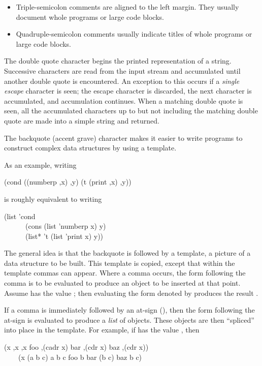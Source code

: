 \begin{flushdesc}
\begin{itemize}
\item
{}
Triple-semicolon comments are aligned to the left margin.
They usually document whole programs or large code blocks.

\item
{}
Quadruple-semicolon comments usually indicate titles of whole programs or large code blocks.
\end{itemize}

\item[\cd{"}]
The double quote character begins the printed representation
of a string.
Successive characters are read from the input stream and accumulated until
another double quote is encountered.
An exception to this occurs if a \emph{single escape} character
is seen; the escape character is discarded,
the next character is accumulated, and accumulation
continues.  When a matching double quote is seen, all the accumulated
characters up to but not including the matching double quote are
made into a simple string and returned.

\item[\cd{{\Xbq}}]
The backquote (accent grave) character
makes it easier to write programs to construct complex data structures by
using a template.
\label{BACKQUOTE}

As an example, writing
\begin{lisp}
{\Xbq}(cond ((numberp ,x) ,{\Xatsign}y) (t (print ,x) ,{\Xatsign}y))
\end{lisp}
is roughly equivalent to writing
\begin{lisp}
(list 'cond  \\
~~~~~~(cons (list 'numberp x) y)  \\
~~~~~~(list* 't (list 'print x) y))
\end{lisp}
The general idea is that the backquote is followed by a template,
a picture of a data structure to be built.  This template is copied,
except that within the template commas can appear.  Where a comma
occurs, the form following the comma is to be evaluated to produce an object to
be inserted at that point.  Assume  has the value ; then
evaluating the form denoted by  produces
the result .

If a comma is immediately followed by an at-sign (\cd{{\Xatsign}}), then the
form following the at-sign is evaluated to produce a \emph{list} of objects.
These objects are then ``spliced'' into place in the template.  For
example, if  has the value , then
\begin{lisp}
{\Xbq}(x ,x ,{\Xatsign}x foo ,(cadr x) bar ,(cdr x) baz ,{\Xatsign}(cdr x)) \\
~~~\EV\ (x (a b c) a b c foo b bar (b c) baz b c)
\end{lisp}


\end{flushdesc}
